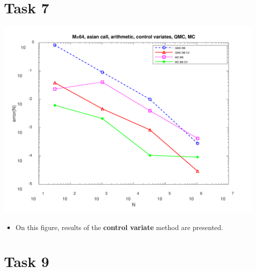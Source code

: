 \documentclass[10pt,a4paper]{article}
\begin{document}
\section*{Task 7}


\begin{center}
	\includegraphics[scale=0.25]{images/task7_error.png}
\end{center}
\begin{itemize}
    \item{
        On this figure, results of the \textbf{control variate}
        method are presented. 
    }
\end{itemize}

\section*{Task 9}
\end{document}
